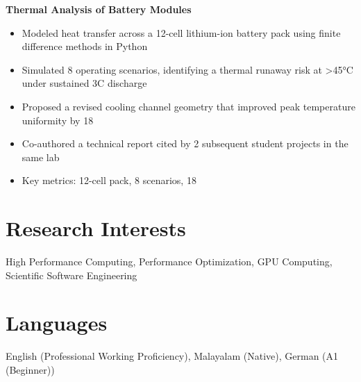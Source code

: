 \documentclass[11pt,a4paper]{article}
\begin{document}
\textbf{ Thermal Analysis of Battery Modules }
\begin{itemize}[leftmargin=*,nosep,topsep=2pt]
    
    \item Modeled heat transfer across a 12-cell lithium-ion battery pack using finite difference methods in Python
    
    \item Simulated 8 operating scenarios, identifying a thermal runaway risk at >45°C under sustained 3C discharge
    
    \item Proposed a revised cooling channel geometry that improved peak temperature uniformity by 18%
    
    \item Co-authored a technical report cited by 2 subsequent student projects in the same lab
    
    \item Key metrics: 12-cell pack, 8 scenarios, 18%
    
\end{itemize}


\section{Research Interests}
High Performance Computing, Performance Optimization, GPU Computing, Scientific Software Engineering

\section{Languages}
English (Professional Working Proficiency), Malayalam (Native), German (A1 (Beginner))
\end{document}
